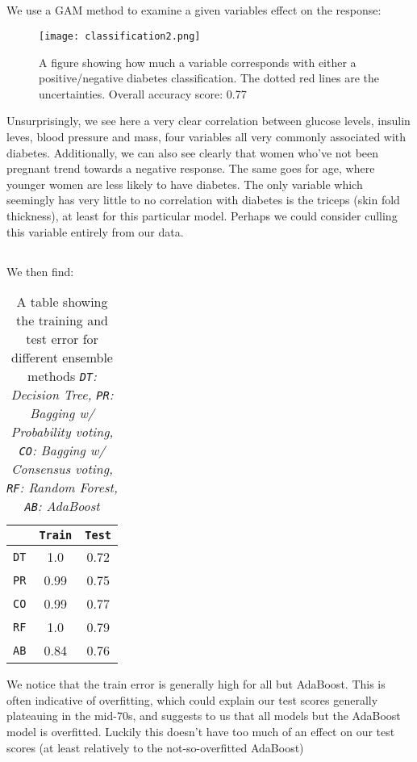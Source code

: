 \documentclass{article}
\begin{document}
\subsection{} 
We use a GAM method to examine a given variables effect on the response:
\begin{figure}[ht!]
    \centering
    \texttt{[image: classification2.png]}
    \caption{A figure showing how much a variable corresponds with either a positive/negative diabetes classification. The dotted red lines are the uncertainties. Overall accuracy score: 0.77}
    \label{figC2}
\end{figure} \newline
Unsurprisingly, we see here a very clear correlation between glucose levels, insulin leves, blood pressure and mass, four variables all very commonly associated with diabetes. Additionally, we can also see clearly that women who've not been pregnant trend towards a negative response. The same goes for age, where younger women are less likely to have diabetes. The only variable which seemingly has very little to no correlation with diabetes is the triceps (skin fold thickness), at least for this particular model. Perhaps we could consider culling this variable entirely from our data.
\subsection{}
We then find:
\begin{table}[ht!]
    \centering
    \begin{tabular}{c|c|c}
         & \texttt{Train} & \texttt{Test} \\
         \hline
         \texttt{DT}&  1.0& 0.72 \\
         \texttt{PR}& 0.99& 0.75 \\
         \texttt{CO}& 0.99& 0.77 \\
         \texttt{RF}& 1.0& 0.79 \\
         \texttt{AB}& 0.84& 0.76 \\
    \end{tabular}
    \caption{A table showing the training and test error for different ensemble methods \newline \textit{\texttt{DT}: Decision Tree, \texttt{PR}: Bagging w/ Probability voting, \texttt{CO}: Bagging w/ Consensus voting, \texttt{RF}: Random Forest, \texttt{AB}: AdaBoost}}
    \label{tabC1}
\end{table} \newline
We notice that the train error is generally high for all but AdaBoost. This is often indicative of overfitting, which could explain our test scores generally plateauing in the mid-70s, and suggests to us that all models but the AdaBoost model is overfitted. Luckily this doesn't have too much of an effect on our test scores (at least relatively to the not-so-overfitted AdaBoost) \newpage
\end{document}
